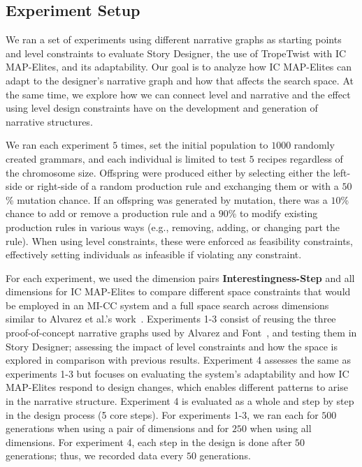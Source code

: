 \subsection{Experiment Setup}







We ran a set of experiments using different narrative graphs as starting points and level constraints to evaluate Story Designer, the use of TropeTwist with IC MAP-Elites, and its adaptability. Our goal is to analyze how IC MAP-Elites can adapt to the designer's narrative graph and how that affects the search space. At the same time, we explore how we can connect level and narrative and the effect using level design constraints have on the development and generation of narrative structures.

We ran each experiment $5$ times, set the initial population to $1000$ randomly created grammars, and each individual is limited to test $5$ recipes regardless of the chromosome size. Offspring were produced either by selecting either the left-side or right-side of a random production rule and exchanging them or with a $50$\% mutation chance. If an offspring was generated by mutation, there was a $10$\% chance to add or remove a production rule and a $90$\% to modify existing production rules in various ways (e.g., removing, adding, or changing part the rule). When using level constraints, these were enforced as feasibility constraints, effectively setting individuals as infeasible if violating any constraint.

For each experiment, we used the dimension pairs \textbf{Interestingness}\textbf{-Step} and all dimensions for IC MAP-Elites to compare different space constraints that would be employed in an MI-CC system and a full space search across dimensions similar to Alvarez et al.'s work~. Experiments 1-3 consist of reusing the three proof-of-concept narrative graphs used by Alvarez and Font~, and testing them in Story Designer; assessing the impact of level constraints and how the space is explored in comparison with previous results. Experiment 4 assesses the same as experiments 1-3 but focuses on evaluating the system's adaptability and how IC MAP-Elites respond to design changes, which enables different patterns to arise in the narrative structure. Experiment 4 is evaluated as a whole and step by step in the design process (5 core steps). For experiments 1-3, we ran each for $500$ generations when using a pair of dimensions and for $250$ when using all dimensions. For experiment 4, each step in the design is done after $50$ generations; thus, we recorded data every $50$ generations.


